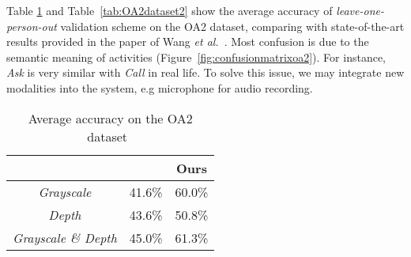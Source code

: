 \documentclass{article}
\begin{document}
Table \ref{tab:OA2dataset} and Table~\ref{tab:OA2dataset2} show the average accuracy of \textit{leave-one-person-out} validation scheme on the OA2 dataset, comparing with state-of-the-art results provided in the paper of Wang \textit{et al.}~\cite{2014_Wang_ConvolutionalNetworks}.
Most confusion is due to the semantic meaning of activities (Figure~\ref{fig:confusionmatrixoa2}).
For instance, \textit{Ask} is very similar with \textit{Call} in real life.
To solve this issue, we may integrate new modalities into the system, e.g microphone for audio recording.

\begin{table}[t]
	\begin{center}
	\caption{Average accuracy on the OA2 dataset~ \cite{2014_Wang_ConvolutionalNetworks}}
	\label{tab:OA2dataset}
	\begin{tabular}{|c|c|c|}
  		\hline
  		\textbf{} & \cite{2014_Wang_ConvolutionalNetworks} & Ours
  		\\
  		\hline
  		\textit{Grayscale} & 41.6\% & 60.0\% \\
  		\hline
  		\textit{Depth} & 43.6\% & 50.8\% \\
  		\hline
  		\textit{Grayscale \& Depth} & 45.0\% & 61.3\% \\
  		\hline
\end{tabular}
\end{center}
\end{table}
\end{document}

